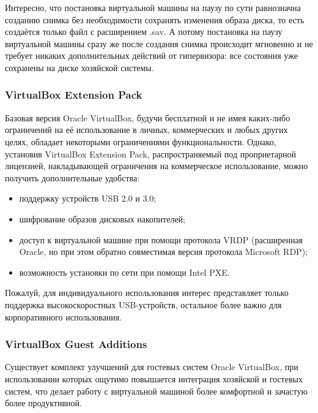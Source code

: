 \documentclass[14pt, a4paper]{article}
\begin{document}
Интересно, что постановка виртуальной машины на паузу по сути равнозначна созданию снимка без
необходимости сохранять изменения образа диска, то есть создаётся только файл с расширением
.sav. А потому постановка на паузу виртуальной машины сразу же после создания снимка происходит
мгновенно и не требует никаких дополнительных действий от гипервизора: все состояния уже
сохранены на диске хозяйской системы.

\subsubsection*{VirtualBox Extension Pack} 

Базовая версия Oracle VirtualBox, будучи бесплатной и не имея каких-либо ограничений на её
использование в личных, коммерческих и любых других целях, обладает некоторыми ограничениями
функциональности. Однако, установив VirtualBox Extension Pack, распространяемый под
проприетарной лицензией, накладывающей ограничения на коммерческое использование, можно
получить дополнительные удобства:

\begin{itemize}
    \item поддержку устройств USB 2.0 и 3.0;
    \item шифрование образов дисковых накопителей;
    \item доступ к виртуальной машине при помощи протокола VRDP (расширенная Oracle, но при этом
    обратно совместимая версия протокола Microsoft RDP);
    \item возможность установки по сети при помощи Intel PXE.
\end{itemize}

Пожалуй, для индивидуального использования интерес представляет только поддержка
высокоскоростных USB-устройств, остальное более важно для корпоративного использования.

\subsubsection*{VirtualBox Guest Additions} 

Существует комплект улучшений для гостевых систем Oracle VirtualBox, при использовании которых
ощутимо повышается интеграция хозяйской и гостевых систем, что делает работу с виртуальной
машиной более комфортной и зачастую более продуктивной.
\end{document}
